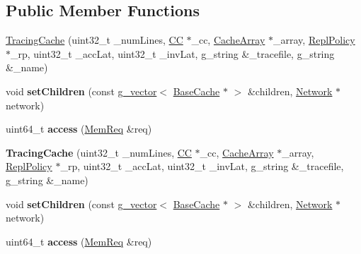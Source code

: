 \subsection*{Public Member Functions}
\begin{DoxyCompactItemize}
\item 
\hyperlink{classTracingCache_a80a198f4c14fa093580105902b7e677a}{Tracing\-Cache} (uint32\-\_\-t \-\_\-num\-Lines, \hyperlink{classCC}{C\-C} $\ast$\-\_\-cc, \hyperlink{classCacheArray}{Cache\-Array} $\ast$\-\_\-array, \hyperlink{classReplPolicy}{Repl\-Policy} $\ast$\-\_\-rp, uint32\-\_\-t \-\_\-acc\-Lat, uint32\-\_\-t \-\_\-inv\-Lat, g\-\_\-string \&\-\_\-tracefile, g\-\_\-string \&\-\_\-name)
\item 
\hypertarget{classTracingCache_ad0c58f50473ba1563afdffc88362d001}{void {\bfseries set\-Children} (const \hyperlink{classg__vector}{g\-\_\-vector}$<$ \hyperlink{classBaseCache}{Base\-Cache} $\ast$ $>$ \&children, \hyperlink{classNetwork}{Network} $\ast$network)}\label{classTracingCache_ad0c58f50473ba1563afdffc88362d001}

\item 
\hypertarget{classTracingCache_aac8f3a33631138adf7a8008ba6411760}{uint64\-\_\-t {\bfseries access} (\hyperlink{structMemReq}{Mem\-Req} \&req)}\label{classTracingCache_aac8f3a33631138adf7a8008ba6411760}

\item 
\hypertarget{classTracingCache_a80a198f4c14fa093580105902b7e677a}{{\bfseries Tracing\-Cache} (uint32\-\_\-t \-\_\-num\-Lines, \hyperlink{classCC}{C\-C} $\ast$\-\_\-cc, \hyperlink{classCacheArray}{Cache\-Array} $\ast$\-\_\-array, \hyperlink{classReplPolicy}{Repl\-Policy} $\ast$\-\_\-rp, uint32\-\_\-t \-\_\-acc\-Lat, uint32\-\_\-t \-\_\-inv\-Lat, g\-\_\-string \&\-\_\-tracefile, g\-\_\-string \&\-\_\-name)}\label{classTracingCache_a80a198f4c14fa093580105902b7e677a}

\item 
\hypertarget{classTracingCache_ad0c58f50473ba1563afdffc88362d001}{void {\bfseries set\-Children} (const \hyperlink{classg__vector}{g\-\_\-vector}$<$ \hyperlink{classBaseCache}{Base\-Cache} $\ast$ $>$ \&children, \hyperlink{classNetwork}{Network} $\ast$network)}\label{classTracingCache_ad0c58f50473ba1563afdffc88362d001}

\item 
\hypertarget{classTracingCache_aac8f3a33631138adf7a8008ba6411760}{uint64\-\_\-t {\bfseries access} (\hyperlink{structMemReq}{Mem\-Req} \&req)}\label{classTracingCache_aac8f3a33631138adf7a8008ba6411760}

\end{DoxyCompactItemize}
